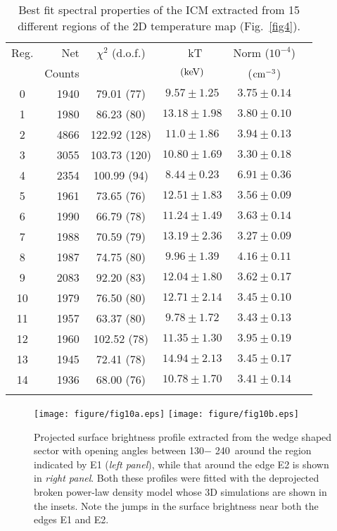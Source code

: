 \documentclass[useASM,usenatbib]{mn2e}
\begin{document}
\begin{table}
\caption{Best fit spectral properties of the ICM extracted from 15 different regions of the 2D temperature map (Fig.~\ref{fig4}).}
\begin{center}
\begin{tabular}{crcccc}
\hline
\hline
Reg.    &Net    & \(\chi^2\) (d.o.f.) & ~\rm kT   &  Norm ($10^{-4}$) \\
        &Counts             &                     & \(\mbox{\rm(keV)}\) &                 ($\rm cm^{-3}$) \\
\hline
0 & 1940  &  79.01 (77)   & $9.57\pm1.25$       & $3.75\pm0.14$ \\
1 & 1980  &  86.23 (80)   & $13.18\pm1.98$	& $3.80\pm0.10$ \\
2 & 4866  &  122.92 (128) & $11.0\pm1.86$	& $3.94\pm0.13$ \\
3 & 3055  &  103.73 (120) & $10.80\pm1.69$	& $3.30\pm0.18$ \\
4 & 2354  &  100.99 (94)  & $8.44\pm0.23$	& $6.91\pm0.36$ \\
5 & 1961  &  73.65 (76)   & $12.51\pm1.83$	& $3.56\pm0.09$ \\
6 & 1990  &  66.79 (78)   & $11.24\pm1.49$	& $3.63\pm0.14$ \\
7 & 1988  &  70.59 (79)   & $13.19\pm2.36$ 	& $3.27\pm0.09$ \\
8 & 1987  &  74.75 (80)   & $9.96\pm1.39$	& $4.16\pm0.11$ \\
9 & 2083  &  92.20 (83)   & $12.04\pm1.80$	& $3.62\pm0.17$ \\
10 & 1979  &  76.50 (80)  & $12.71\pm2.14$      & $3.45\pm0.10$ \\
11 & 1957  &  63.37 (80)  & $9.78\pm1.72$ 	& $3.43\pm0.13$ \\
12 & 1960  &  102.52 (78) & $11.35\pm1.30$	& $3.95\pm0.19$ \\
13 & 1945  &  72.41 (78)  & $14.94\pm2.13$	& $3.45\pm0.17$ \\
14 & 1936  &  68.00 (76)  & $10.78\pm1.70$	& $3.41\pm0.14$ \\
\hline
\hline
\label{fit_results}
\end{tabular}
\end{center}
\end{table}
\begin{figure*}
\texttt{[image: figure/fig10a.eps]}
\texttt{[image: figure/fig10b.eps]}
\caption{Projected surface brightness profile extracted from the wedge
  shaped sector with opening angles between 130\degr $-$
  240\degr~around the region indicated by E1 ({\it left panel}), while
  that around the edge E2 is shown in {\it right panel}. Both these
  profiles were fitted with the deprojected broken power-law density
  model whose 3D simulations are shown in the insets. Note the jumps
  in the surface brightness near both the edges E1 and E2.}
\label{fig3}
\end{figure*}
\end{document}
